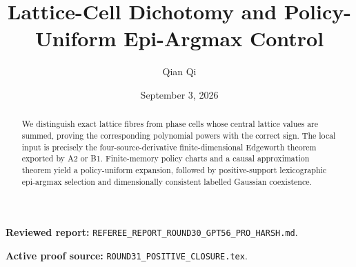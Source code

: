 \documentclass[11pt,reqno]{amsart}
\title[D1 Round 31 revision]{Lattice-Cell Dichotomy and Policy-Uniform Epi-Argmax Control}
\author{Qian Qi}
\date{September 3, 2026}
\begin{document}
\begin{abstract}
We distinguish exact lattice fibres from phase cells whose central lattice values are summed, proving the corresponding polynomial powers with the correct sign.  The local input is precisely the four-source-derivative finite-dimensional Edgeworth theorem exported by A2 or B1.  Finite-memory policy charts and a causal approximation theorem yield a policy-uniform expansion, followed by positive-support lexicographic epi-argmax selection and dimensionally consistent labelled Gaussian coexistence.
\end{abstract}
\maketitle
\noindent\textbf{Reviewed report:} \texttt{REFEREE\_REPORT\_ROUND30\_GPT56\_PRO\_HARSH.md}.\par
\noindent\textbf{Active proof source:} \texttt{ROUND31\_POSITIVE\_CLOSURE.tex}.\par

\end{document}
